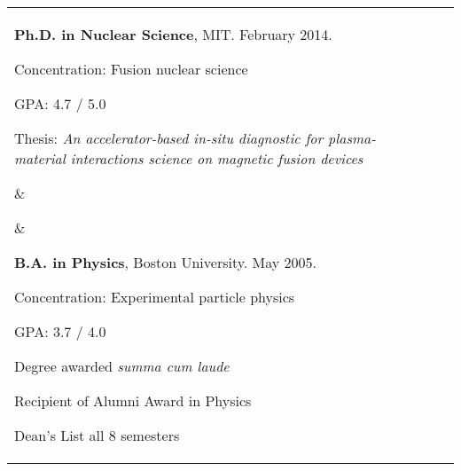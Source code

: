 \documentclass[10pt]{article}
\begin{document}
%
\begin{tabular}[t]{@{}p{\textwidth-\rcollength-\spacewidth}@{}p{\spacewidth}@{}p{\rcollength}}%

\parbox{\textwidth-\rcollength-\spacewidth}{%
\textbf{Ph.D. in Nuclear Science}, MIT. February 2014.

\begin{innerlist}
\item Concentration: Fusion nuclear science
\item GPA: 4.7 / 5.0
\item Thesis: \emph{An accelerator-based in-situ diagnostic for plasma-material interactions science on magnetic fusion devices}
\end{innerlist}

}
& \parbox{\spacewidth}{\centering} &

\parbox{\rcollength}{%
\textbf{B.A. in Physics}, Boston University. May 2005.
\begin{innerlist}
\item Concentration: Experimental particle physics
\item GPA: 3.7 / 4.0
\item Degree awarded \emph{summa cum laude}
\item Recipient of Alumni Award in Physics
\item Dean's List all 8 semesters
\end{innerlist}
}
\end{tabular}

\vspace{0.4cm}
\end{document}

